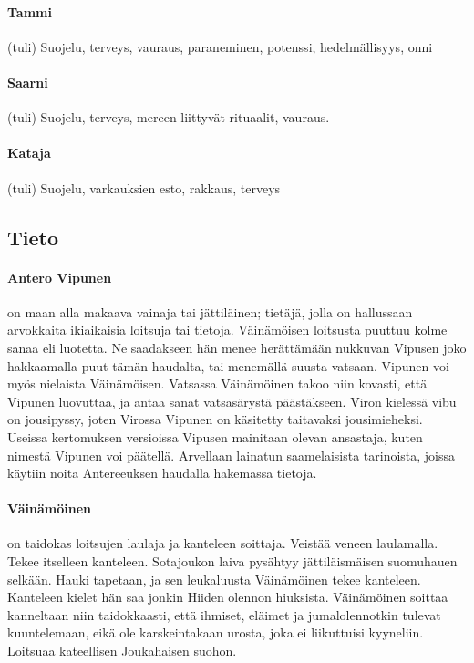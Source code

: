   \paragraph{Tammi} (tuli) Suojelu, terveys, vauraus, paraneminen, potenssi, hedelmällisyys, onni
  \paragraph{Saarni} (tuli) Suojelu, terveys, mereen liittyvät rituaalit, vauraus. 
  \paragraph{Kataja} (tuli) Suojelu, varkauksien esto, rakkaus, terveys



\subsection{Tieto}

  \paragraph{Antero Vipunen} on maan alla makaava vainaja tai jättiläinen; tietäjä, jolla on 
    hallussaan arvokkaita ikiaikaisia loitsuja tai tietoja. Väinämöisen loitsusta puuttuu kolme 
    sanaa eli luotetta. Ne saadakseen hän menee herättämään nukkuvan Vipusen joko hakkaamalla 
    puut tämän haudalta, tai menemällä suusta vatsaan. Vipunen voi myös nielaista Väinämöisen. 
    Vatsassa Väinämöinen takoo niin kovasti, että Vipunen luovuttaa, ja antaa sanat vatsasärystä 
    päästäkseen. Viron kielessä vibu on jousipyssy, joten Virossa Vipunen on käsitetty taitavaksi 
    jousimieheksi. Useissa kertomuksen versioissa Vipusen mainitaan olevan ansastaja, kuten 
    nimestä Vipunen voi päätellä. Arvellaan lainatun saamelaisista tarinoista, joissa käytiin 
    noita Antereeuksen haudalla hakemassa tietoja.  
  \paragraph{Väinämöinen} on taidokas loitsujen laulaja ja kanteleen soittaja. Veistää veneen 
    laulamalla. Tekee itselleen kanteleen. Sotajoukon laiva pysähtyy jättiläismäisen suomuhauen 
    selkään. Hauki tapetaan, ja sen leukaluusta Väinämöinen tekee kanteleen. Kanteleen kielet hän 
    saa jonkin Hiiden olennon hiuksista. Väinämöinen soittaa kanneltaan niin taidokkaasti, että 
    ihmiset, eläimet ja jumalolennotkin tulevat kuuntelemaan, eikä ole karskeintakaan urosta, joka 
    ei liikuttuisi kyyneliin. Loitsuaa kateellisen Joukahaisen suohon. 
